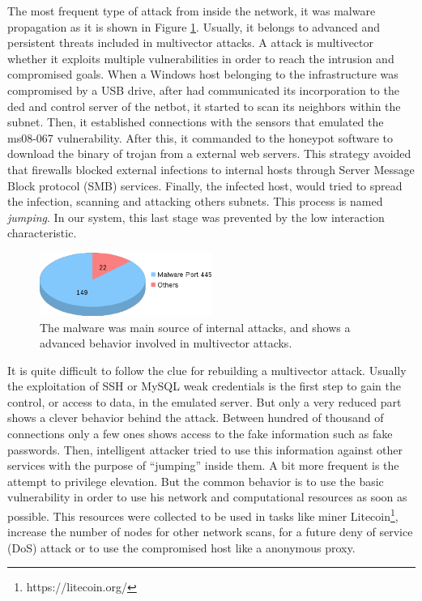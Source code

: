 \documentclass[a4paper]{llncs}
\begin{document}
The most frequent type of attack from inside the network, it was malware propagation as it is shown in Figure \ref{fig:internalTypes}. Usually, it belongs to advanced and persistent threats included in multivector attacks. A attack is multivector whether it exploits multiple vulnerabilities in order to reach the intrusion and compromised goals. When a Windows host belonging to the infrastructure was compromised by a USB drive, after had communicated its incorporation to the ded and control server of the netbot, it started to scan its neighbors within the subnet. Then, it established connections with the sensors that  emulated the ms08-067 \cite{ms08067} vulnerability. After this, it commanded to the honeypot software to download the binary of trojan from a external web servers. This strategy avoided that firewalls blocked external infections to internal hosts through Server Message Block protocol (SMB) services. Finally, the infected host, would tried to spread the infection, scanning and attacking others subnets. This process is named {\it jumping}. In our system, this last stage was prevented by the low interaction characteristic.

\begin{figure}[h]
	\includegraphics[width=0.5\textwidth]{internalTypes.png}
	\centering
	\caption{The malware was main source of internal attacks, and shows a advanced behavior involved in multivector attacks.\label{fig:internalTypes}}
\end{figure}

It is quite difficult to follow the clue for rebuilding a multivector attack. Usually the exploitation of SSH or MySQL weak credentials is the first step to gain the control, or access to data, in the emulated server. But only a very reduced part shows a clever behavior behind the attack. Between hundred of thousand of connections only a few ones shows access to the fake information such as fake passwords. Then, intelligent attacker tried to use this information against other services with the purpose of  ``jumping'' inside them. A bit more frequent is the attempt to privilege elevation. But the common behavior is to use the basic vulnerability in order to use his network and computational resources as soon as possible. This resources were collected to be used in tasks like miner Litecoin\footnote{https://litecoin.org/}, increase the number of nodes for other network scans, for a future deny of service (DoS) attack or to use the compromised host like a anonymous proxy.
\end{document}
